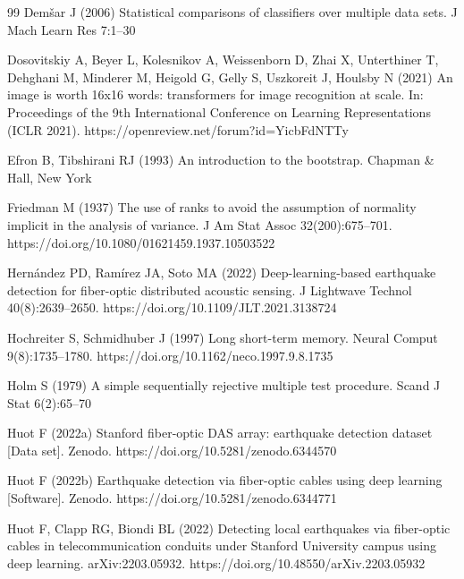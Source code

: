 \begin{thebibliography}{99}
Dem\v{s}ar J (2006) Statistical comparisons of classifiers over multiple data sets. J Mach Learn Res 7:1--30

Dosovitskiy A, Beyer L, Kolesnikov A, Weissenborn D, Zhai X, Unterthiner T, Dehghani M, Minderer M, Heigold G, Gelly S, Uszkoreit J, Houlsby N (2021) An image is worth 16x16 words: transformers for image recognition at scale. In: Proceedings of the 9th International Conference on Learning Representations (ICLR 2021). https://openreview.net/forum?id=YicbFdNTTy

Efron B, Tibshirani RJ (1993) An introduction to the bootstrap. Chapman \& Hall, New York

Friedman M (1937) The use of ranks to avoid the assumption of normality implicit in the analysis of variance. J Am Stat Assoc 32(200):675--701. https://doi.org/10.1080/01621459.1937.10503522

Hern\'andez PD, Ram\'irez JA, Soto MA (2022) Deep-learning-based earthquake detection for fiber-optic distributed acoustic sensing. J Lightwave Technol 40(8):2639--2650. https://doi.org/10.1109/JLT.2021.3138724

Hochreiter S, Schmidhuber J (1997) Long short-term memory. Neural Comput 9(8):1735--1780. https://doi.org/10.1162/neco.1997.9.8.1735

Holm S (1979) A simple sequentially rejective multiple test procedure. Scand J Stat 6(2):65--70

Huot F (2022a) Stanford fiber-optic DAS array: earthquake detection dataset [Data set]. Zenodo. https://doi.org/10.5281/zenodo.6344570

Huot F (2022b) Earthquake detection via fiber-optic cables using deep learning [Software]. Zenodo. https://doi.org/10.5281/zenodo.6344771

Huot F, Clapp RG, Biondi BL (2022) Detecting local earthquakes via fiber-optic cables in telecommunication conduits under Stanford University campus using deep learning. arXiv:2203.05932. https://doi.org/10.48550/arXiv.2203.05932


\end{thebibliography}
